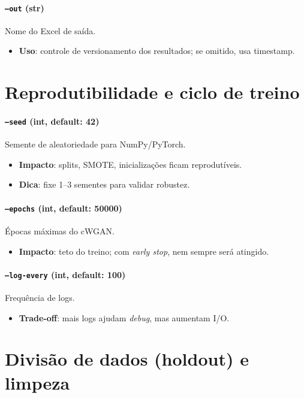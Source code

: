 \documentclass[11pt,a4paper]{article}
\begin{document}
\paragraph{\texttt{--out} (str)} Nome do Excel de saída.
\begin{itemize}[leftmargin=1.2em]
  \item \textbf{Uso}: controle de versionamento dos resultados; se omitido, usa timestamp.
\end{itemize}

\section{Reprodutibilidade e ciclo de treino}

\paragraph{\texttt{--seed} (int, default: 42)} Semente de aleatoriedade para NumPy/PyTorch.
\begin{itemize}[leftmargin=1.2em]
  \item \textbf{Impacto}: splits, SMOTE, inicializações ficam reprodutíveis.
  \item \textbf{Dica}: fixe 1--3 sementes para validar robustez.
\end{itemize}

\paragraph{\texttt{--epochs} (int, default: 50000)} Épocas máximas do cWGAN.
\begin{itemize}[leftmargin=1.2em]
  \item \textbf{Impacto}: teto do treino; com \emph{early stop}, nem sempre será atingido.
\end{itemize}

\paragraph{\texttt{--log-every} (int, default: 100)} Frequência de logs.
\begin{itemize}[leftmargin=1.2em]
  \item \textbf{Trade-off}: mais logs ajudam \emph{debug}, mas aumentam I/O.
\end{itemize}

\section{Divisão de dados (holdout) e limpeza}
\end{document}
